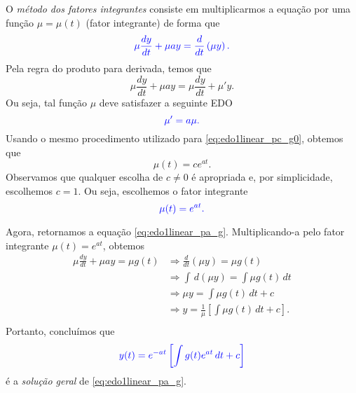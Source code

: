 O \emph{método dos fatores integrantes} consiste em multiplicarmos a equação por uma função $\mu = \mu(t)$ (fator integrante) de forma que
\begin{equation}
  \color{blue}{\mu\frac{dy}{dt} + \mu ay = \frac{d}{dt}\left(\mu y\right).}
\end{equation}
Pela regra do produto para derivada, temos que
\begin{equation}
  \mu\frac{dy}{dt} + \mu ay = \mu\frac{dy}{dt} + \mu'y.
\end{equation}
Ou seja, tal função $\mu$ deve satisfazer a seguinte EDO
\begin{equation}
  \color{blue}{\mu' = a\mu.}
\end{equation}
Usando o mesmo procedimento utilizado para \eqref{eq:edo1linear_pc_g0}, obtemos que
\begin{equation}
  \mu(t) = ce^{at}.
\end{equation}
Observamos que qualquer escolha de $c\neq 0$ é apropriada e, por simplicidade, escolhemos $c=1$. Ou seja, escolhemos o fator integrante
\begin{equation}
  \color{blue}{\mu(t) = e^{at}}.
\end{equation}

Agora, retornamos a equação \eqref{eq:edo1linear_pa_g}. Multiplicando-a pelo fator integrante $\mu(t) = e^{at}$, obtemos
\begin{align}
  \mu\frac{dy}{dt} + \mu a y = \mu g(t) &\Rightarrow \frac{d}{dt}\left(\mu y\right) = \mu g(t) \\
                                        &\Rightarrow \int \,d(\mu y) = \int \mu g(t)\,dt \\
                                        &\Rightarrow \mu y = \int \mu g(t)\,dt + c \\
                                        &\Rightarrow y = \frac{1}{\mu}\left[\int \mu g(t)\,dt + c\right]. \\
\end{align}
Portanto, concluímos que
\begin{equation}
  \color{blue}{y(t) = e^{-at}\left[\int g(t)e^{at}\,dt + c\right]}
\end{equation}
é a \emph{solução geral} de \eqref{eq:edo1linear_pa_g}.


